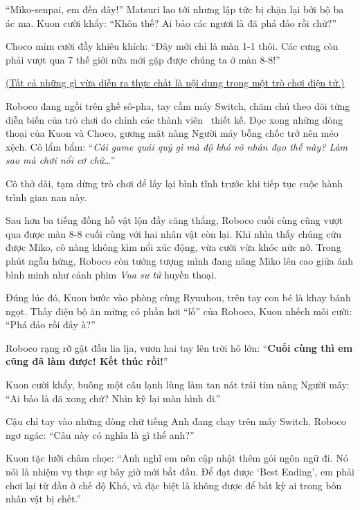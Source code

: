 \documentclass[../main.tex]{subfiles}
\begin{document}
``Miko-senpai, em đến đây!'' Matsuri lao tới nhưng lập tức bị chặn lại bởi bộ ba ác ma. Kuon cười khẩy: ``Khôn thế? Ai bảo các ngươi là đã phá đảo rồi chứ?''

Choco mỉm cười đầy khiêu khích: ``Đây mới chỉ là màn 1-1 thôi. Các cưng còn phải vượt qua 7 thế giới nữa mới gặp được chúng ta ở màn 8-8!''

\begin{center}
  \uline{(Tất cả những gì vừa diễn ra thực chất là nội dung trong một trò chơi điện tử.)}
\end{center}

Roboco đang ngồi trên ghế sô-pha, tay cầm máy Switch, chăm chú theo dõi từng diễn biến của trò chơi do chính các thành viên \hll\ thiết kế. Đọc xong những dòng thoại của Kuon và Choco, gương mặt nàng Người máy bỗng chốc trở nên méo xệch. Cô lẩm bẩm: ``\textit{Cái game quái quỷ gì mà độ khó vô nhân đạo thế này? Làm sao mà chơi nổi cơ chứ\dots}''

Cô thở dài, tạm dừng trò chơi để lấy lại bình tĩnh trước khi tiếp tục cuộc hành trình gian nan này.

\omk


Sau hơn ba tiếng đồng hồ vật lộn đầy căng thẳng, Roboco cuối cùng cũng vượt qua được màn 8-8 cuối cùng với hai nhân vật còn lại. Khi nhìn thấy chúng cứu được Miko, cô nàng không kìm nổi xúc động, vừa cười vừa khóc nức nở. Trong phút ngẫu hứng, Roboco còn tưởng tượng mình đang nâng Miko lên cao giữa ánh bình minh như cảnh phim \textit{Vua sư tử} huyền thoại.

Đúng lúc đó, Kuon bước vào phòng cùng Ryuuhou, trên tay con bé là khay bánh ngọt. Thấy điệu bộ ăn mừng có phần hơi ``lố'' của Roboco, Kuon nhếch môi cười: ``Phá đảo rồi đấy à?''

Roboco rạng rỡ gật đầu lia lịa, vươn hai tay lên trời hô lớn: ``\textbf{Cuối cùng thì em cũng đã làm được! Kết thúc rồi!}''

Kuon cười khẩy, buông một câu lạnh lùng làm tan nát trái tim nàng Người máy: ``Ai bảo là đã xong chứ? Nhìn kỹ lại màn hình đi.''

Cậu chỉ tay vào những dòng chữ tiếng Anh đang chạy trên máy Switch. Roboco ngơ ngác: ``Câu này có nghĩa là gì thế anh?''

Kuon tặc lưỡi châm chọc: ``Anh nghĩ em nên cập nhật thêm gói ngôn ngữ đi. Nó nói là nhiệm vụ thực sự bây giờ mới bắt đầu. Để đạt được `Best Ending', em phải chơi lại từ đầu ở chế độ Khó, và đặc biệt là không được để bất kỳ ai trong bốn nhân vật bị chết.''
\end{document}
